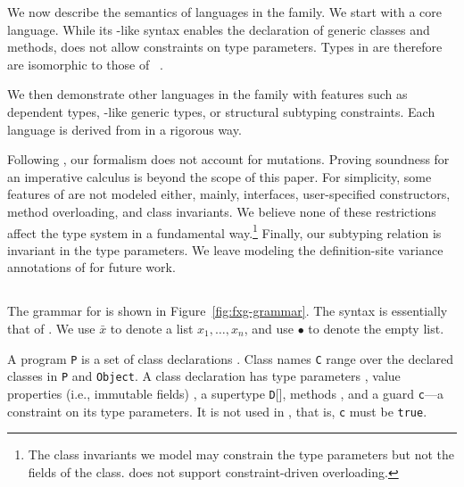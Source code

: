 \newcommand\comma{,~}
\newcommand\tj[2]{{#1} \vdash_{\cal T}{#2}}
\newcommand\cj[2]{{#1} \vdash_{\cal C}{#2}}
\newcommand\wj[2]{{#1} \vdash_{\cal W}{#2}}
\newcommand\cdecl{{\tt class}~{\tt C}[\tbar{X}]\{{\tt c}\}(\tbar{f}\ty\tbar{F})~{\tt extends}~{\tt D}[\tbar{E}]~\{~\tbar{M}~\}}
\newcommand\msign[5]{{\tt m}[\tbar{#1}](\tbar{#2}\ty\tbar{#3})\{{\tt #4}\}\ty{\tt #5}}
\newcommand\minst[6]{\msign{#1}{#2}{#3}{#4}{#5}={\tt #6}}
\newcommand\mdecl[6]{{\tt def}~\minst{#1}{#2}{#3}{#4}{#5}{#6}}
\newcommand{\vdashQ}{\vdash_{\cal Q}}
\newcommand{\vdashS}{\vdash_{\cal S}}
\newcommand{\Dom}{{\sf Dom}}
\newcommand{\Img}{{\sf Img}}

We now describe the semantics of languages in the  family. We start with a core \FXGL{\cdot} language. While its \FGJ-like syntax enables the declaration of generic classes and methods, \FXGL{\cdot} does not allow constraints on type parameters. Types in \FXGL{\cdot} are therefore are isomorphic to those of \CFJ~\cite{constrained-types}.

We then demonstrate other languages in the family with features such as dependent types, \FGJ-like generic types, or structural subtyping constraints. Each language is derived from \FXGL{\cdot} in a rigorous way. %

Following \FJ, our formalism does not account for mutations. Proving soundness for an imperative calculus is beyond the scope of this paper.
For simplicity, some features of \Xten are not modeled either, mainly, interfaces, user-specified constructors, method overloading, and class invariants. We believe none of these restrictions affect the type system in a fundamental way.\footnote{The class invariants we model may constrain the type parameters but not the fields of the class. \Xten does not support constraint-driven overloading.} Finally, our subtyping relation is invariant in the type parameters. We leave modeling the definition-site variance annotations of \Xten for future work.


\subsection{\FXGL{\cdot}}

The grammar for \FXGL{\cdot} is shown in Figure~\ref{fig:fxg-grammar}. The syntax is essentially that of \FGJ. We use $\bar{x}$ to denote a list $x_1, \dots, x_n$, and use $\bullet$ to denote the empty list.

A program {\tt P} is a set of class declarations . Class names {\tt C} range over the declared classes in {\tt P} and {\tt Object}. A class declaration has type parameters , value properties (i.e., immutable fields) , a supertype {\tt D}[], methods , and a guard {\tt c}---a constraint on its type parameters. It is not used in \FXGL{\cdot}, that is, {\tt c} must be {\tt true}.


